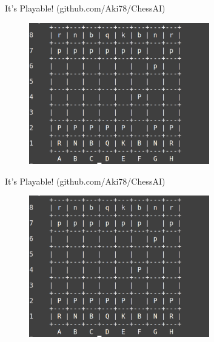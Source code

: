 \documentclass{beamer}
\begin{document}
\begin{frame}{It's Playable! (github.com/Aki78/ChessAI)}
    \begin{figure}
        \centering
        \includegraphics[width=0.7\textwidth]{playable.png} %

    \end{figure}
\end{frame}


\begin{frame}{It's Playable! (github.com/Aki78/ChessAI)}
    \begin{figure}
        \centering
        \includegraphics[width=0.7\textwidth]{playable.png} %

    \end{figure}
\end{frame}
\end{document}
